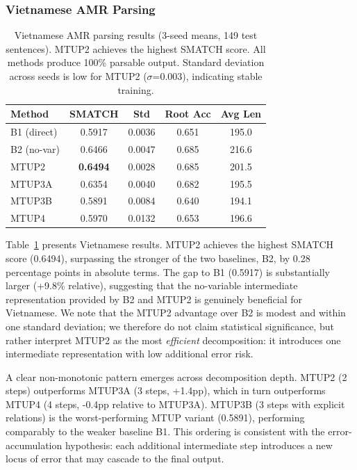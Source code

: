 \documentclass[11pt,a4paper]{article}
\begin{document}
\subsubsection{Vietnamese AMR Parsing}

\begin{table}[t]
\centering
\small
\begin{tabular}{lcccc}
\toprule
\textbf{Method} & \textbf{SMATCH} & \textbf{Std} & \textbf{Root Acc} & \textbf{Avg Len} \\
\midrule
B1 (direct)       & 0.5917 & 0.0036 & 0.651 & 195.0 \\
B2 (no-var)       & 0.6466 & 0.0047 & 0.685 & 216.6 \\
\midrule
MTUP2             & \textbf{0.6494} & 0.0028 & 0.685 & 201.5 \\
MTUP3A            & 0.6354 & 0.0040 & 0.682 & 195.5 \\
MTUP3B            & 0.5891 & 0.0084 & 0.640 & 194.1 \\
MTUP4             & 0.5970 & 0.0132 & 0.653 & 196.6 \\
\bottomrule
\end{tabular}
\caption{Vietnamese AMR parsing results (3-seed means, 149 test sentences).
MTUP2 achieves the highest SMATCH score. All methods produce 100\% parsable
output. Standard deviation across seeds is low for MTUP2 ($\sigma$=0.003),
indicating stable training.}
\label{tab:vietnamese}
\end{table}

Table~\ref{tab:vietnamese} presents Vietnamese results. MTUP2 achieves the
highest SMATCH score (0.6494), surpassing the stronger of the two baselines,
B2, by 0.28 percentage points in absolute terms. The gap to B1 (0.5917) is
substantially larger (+9.8\% relative), suggesting that the no-variable
intermediate representation provided by B2 and MTUP2 is genuinely beneficial
for Vietnamese. We note that the MTUP2 advantage over B2 is modest and within
one standard deviation; we therefore do not claim statistical significance, but
rather interpret MTUP2 as the most \emph{efficient} decomposition: it
introduces one intermediate representation with low additional error risk.

A clear non-monotonic pattern emerges across decomposition depth. MTUP2
(2 steps) outperforms MTUP3A (3 steps, +1.4pp), which in turn outperforms
MTUP4 (4 steps, -0.4pp relative to MTUP3A). MTUP3B (3 steps with explicit
relations) is the worst-performing MTUP variant (0.5891), performing
comparably to the weaker baseline B1. This ordering is consistent with the
error-accumulation hypothesis: each additional intermediate step introduces a
new locus of error that may cascade to the final output.
\end{document}
